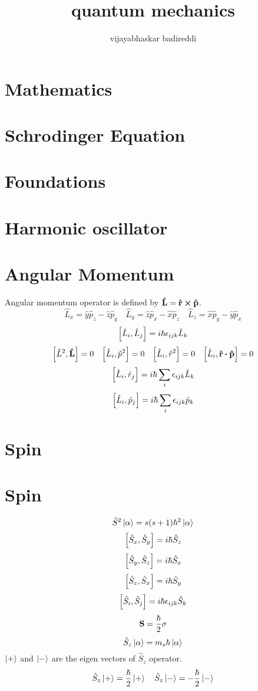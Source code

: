 \documentclass[12pt]{article}
\title{quantum mechanics}
\author{vijayabhaskar badireddi}
\begin{document}
\section{Mathematics}
\section{Schrodinger Equation}
\section{Foundations}
\section{Harmonic oscillator}
\section{Angular Momentum}
Angular momentum operator is defined by $\vb{\vu{L}}=\vb{\vu{r}}\cp\vb{\vu{p}}$.
\[\hat{L}_x=\hat{y}\hat{p}_z-\hat{z}\hat{p}_y\quad\hat{L}_y=\hat{z}\hat{p}_x-\hat{x}\hat{p}_z\quad\hat{L}_z=\hat{x}\hat{p}_y-\hat{y}\hat{p}_x\]
\[\comm{\hat{L}_i}{\hat{L}_j}=i\hbar\epsilon_{ijk}\hat{L}_k\]
\[\comm{\hat{L}^2}{\vb{\vu{L}}}=0\quad\comm{\hat{L}_i}{\hat{p}^2}=0\quad\comm{\hat{L}_i}{\hat{r}^2}=0\quad\comm{\hat{L}_i}{\vb{\vu{r}}\vdot\vb{\vu{p}}}=0\]
\[\comm{\hat{L}_i}{\hat{r}_j}=i\hbar\sum_{i}\epsilon_{ijk}\hat{L}_k\]
\[\comm{\hat{L}_i}{\hat{p}_j}=i\hbar\sum_{i}\epsilon_{ijk}\hat{p}_k\]
\section{Spin}

\section{Spin}
\[\hat{S}^{2}\ket{\alpha}=s(s+1)\hbar^2\ket{\alpha}\]
\[\comm{\hat{S}_{x}}{\hat{S}_{y}}=i\hbar\hat{S}_{z}\]
\[\comm{\hat{S}_{y}}{\hat{S}_{z}}=i\hbar\hat{S}_{x}\]
\[\comm{\hat{S}_{z}}{\hat{S}_{x}}=i\hbar\hat{S}_{y}\]
\[\comm{\hat{S}_{i}}{\hat{S}_{j}}=i\hbar\epsilon_{ijk}\hat{S}_{k}\]
\[\vb{S}=\frac{\hbar}{2}\vb{\sigma}\]
\[\hat{S}_{z}\ket{\alpha}=m_{s}\hbar\ket{\alpha}\]
$\ket{+}$ and $\ket{-}$ are the eigen vectors of $\hat{{S}}_z$ operator.
\[\hat{{S}}_z\ket{+}=\frac{\hbar}{2}\ket{+}\quad\hat{{S}}_z\ket{-}=-\frac{\hbar}{2}\ket{-}\]
\end{document}
